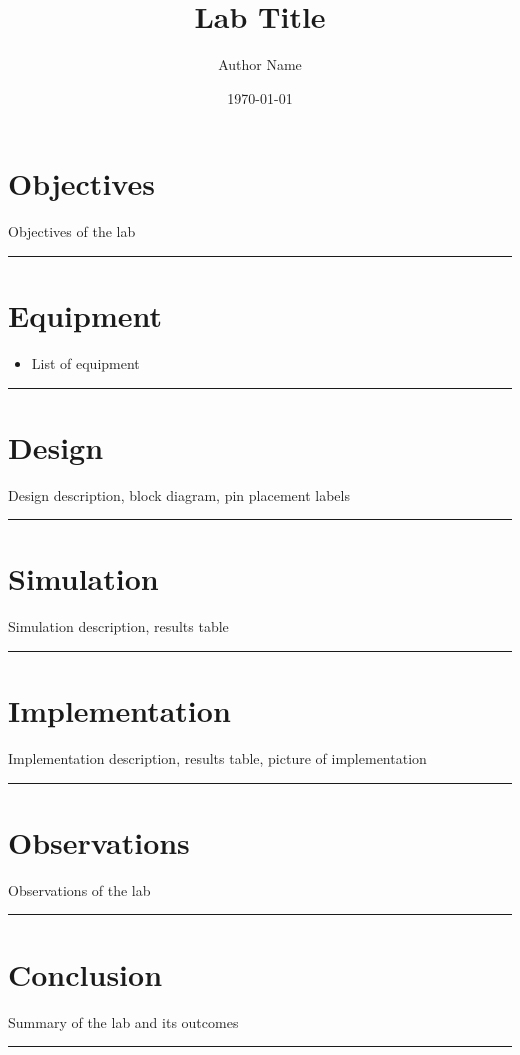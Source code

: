 \documentclass[11pt]{article}
\title{\textbf{{\huge Lab Title}}}
\author{Author Name}
\date{\today}
\begin{document}
\pagestyle{fancy}
\fancyhf{}
\rhead{\thepage}
\maketitle
\section*{\textcolor{mycolor}{Objectives}}
Objectives of the lab
\vspace{5mm}
\hrule

\section*{\textcolor{mycolor}{Equipment}}
\begin{itemize}
  \item List of equipment
\end{itemize}
\vspace{5mm}
\hrule

\section*{\textcolor{mycolor}{Design}}
Design description, block diagram, pin placement labels
\vspace{5mm}
\hrule

\section*{\textcolor{mycolor}{Simulation}}
Simulation description, results table
\vspace{5mm}
\hrule

\section*{\textcolor{mycolor}{Implementation}}
Implementation description, results table, picture of implementation
\vspace{5mm}
\hrule

\section*{\textcolor{mycolor}{Observations}}
Observations of the lab
\vspace{5mm}
\hrule

\section*{\textcolor{mycolor}{Conclusion}}
Summary of the lab and its outcomes
\vspace{5mm}
\hrule
\end{document}
